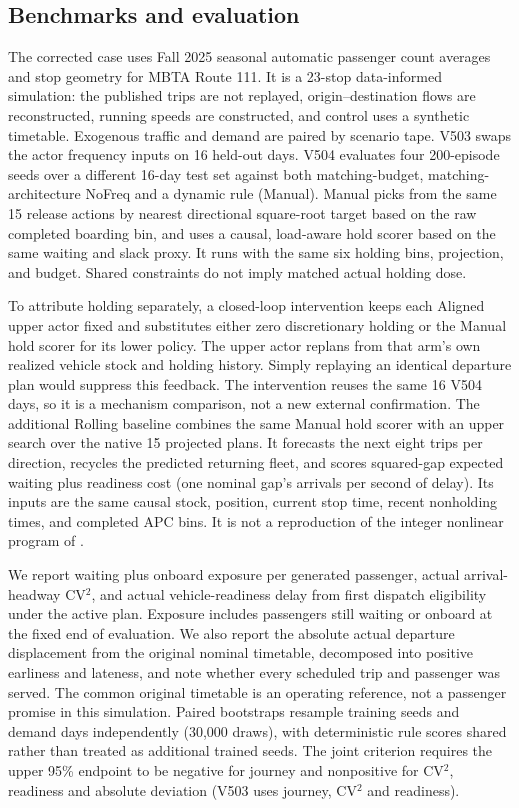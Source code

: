 \subsection{Benchmarks and evaluation}
The corrected case uses Fall 2025 seasonal automatic passenger count averages and stop geometry for MBTA Route 111. It is a 23-stop data-informed simulation: the published trips are not replayed, origin--destination flows are reconstructed, running speeds are constructed, and control uses a synthetic timetable. Exogenous traffic and demand are paired by scenario tape. V503 swaps the actor frequency inputs on 16 held-out days. V504 evaluates four 200-episode seeds over a different 16-day test set against both matching-budget, matching-architecture NoFreq and a dynamic rule (Manual). Manual picks from the same 15 release actions by nearest directional square-root target based on the raw completed boarding bin, and uses a causal, load-aware hold scorer based on the same waiting and slack proxy. It runs with the same six holding bins, projection, and budget. Shared constraints do not imply matched actual holding dose.

To attribute holding separately, a closed-loop intervention keeps each Aligned upper actor fixed and substitutes either zero discretionary holding or the Manual hold scorer for its lower policy. The upper actor replans from that arm's own realized vehicle stock and holding history. Simply replaying an identical departure plan would suppress this feedback. The intervention reuses the same 16 V504 days, so it is a mechanism comparison, not a new external confirmation. The additional Rolling baseline combines the same Manual hold scorer with an upper search over the native 15 projected plans. It forecasts the next eight trips per direction, recycles the predicted returning fleet, and scores squared-gap expected waiting plus readiness cost (one nominal gap's arrivals per second of delay). Its inputs are the same causal stock, position, current stop time, recent nonholding times, and completed APC bins. It is not a reproduction of the integer nonlinear program of \citet{gkiotsalitis2021rescheduling}.

We report waiting plus onboard exposure per generated passenger, actual arrival-headway CV$^2$, and actual vehicle-readiness delay from first dispatch eligibility under the active plan. Exposure includes passengers still waiting or onboard at the fixed end of evaluation. We also report the absolute actual departure displacement from the original nominal timetable, decomposed into positive earliness and lateness, and note whether every scheduled trip and passenger was served. The common original timetable is an operating reference, not a passenger promise in this simulation. Paired bootstraps resample training seeds and demand days independently (30,000 draws), with deterministic rule scores shared rather than treated as additional trained seeds. The joint criterion requires the upper 95\% endpoint to be negative for journey and nonpositive for CV$^2$, readiness and absolute deviation (V503 uses journey, CV$^2$ and readiness).
